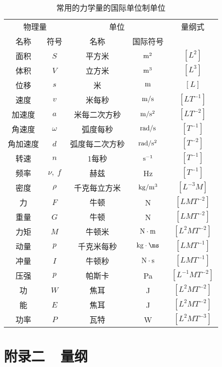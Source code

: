 \begin{table}\centering
    \caption{常用的力学量的国际单位制单位}
    \begin{tabular}{cc|cc|c}
      \hline
        \multicolumn{2}{c}{物理量}     & \multicolumn{2}{|c|}{单位}& 量纲式\\
名称 & 符号 & 名称 & 国际符号 &\\
\hline
面积    &  $S$    &  平方米    & ${\rm m}^2$ & $[L^2]$ \\
体积   &  $V$    &   立方米   &  ${\rm m}^3$ &$[L^3]$\\
位移   &  $s$    &   米   &  ${\rm m}$ &$[L]$\\
速度   &   $v$   &    米每秒  & ${\rm m}/{\rm s}$ &$[LT^{-1}]$  \\
加速度   &  $a$    & 米每二次方秒     &  ${\rm m}/{\rm s^2}$ & $[LT^{-2}]$\\
角速度   &  $\omega$    &  弧度每秒    & ${\rm rad}/{\rm s}$ & $[T^{-1}]$ \\
角加速度   &  $d$    &   弧度每二次方秒   &  ${\rm rad}/{\rm s^2}$ & $[T^{-2}]$\\
转速   &   $n$   &   1每秒   &  ${\rm s}^{-1}$ & $[T^{-1}]$\\
频率   &  $\nu,\; f$    &  赫兹    &  Hz & $[T^{-1}]$\\
密度   &  $\rho$    &  千克每立方米    & ${\rm kg}/{\rm m^3}$  &$[L^{-3}M]$ \\
力   &  $F$    &  牛顿    &  N &$[LMT^{-2}]$\\
重量   &  $G$    &    牛顿  & N  &$[LMT^{-2}]$\\
力矩   &  $M$    &    牛顿米  & ${\rm N}\cdot {\rm m}$  & $[L^2MT^{-2}]$\\
动量   &  $p$    & 千克米每秒     &  ${\rm kg}\cdot {\ms}$ &$[LMT^{-1}]$\\
冲量   &  $I$    &  牛顿秒    &   ${\rm N}\cdot {\rm s}$&$[LMT^{-1}]$\\
压强   &  $p$    &   帕斯卡   &  Pa & $[L^{-1}MT^{-2}]$\\
功   &  $W$    &   焦耳   &  J & $[L^2MT^{-2}]$\\
能   &   $E$   &   焦耳   &  J & $[L^2MT^{-2}]$\\
功率   &  $P$    &  瓦特    & W &$[L^2MT^{-3}]$ \\
\hline
    \end{tabular}
\end{table}	





\chapter{附录二~~量纲}

